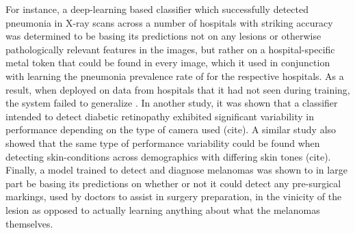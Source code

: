 	For instance, a deep-learning based classifier which successfully detected pneumonia in X-ray scans across a number of hospitals with striking accuracy was determined to be basing its predictions not on any lesions or otherwise pathologically relevant features in the images, but rather on a hospital-specific metal token that could be found in every image, which it used in conjunction with learning the pneumonia prevalence rate of for the respective hospitals. As a result, when deployed on data from hospitals that it had not seen during training, the system failed to generalize \cite{pneumonia}. In another study, it was shown that a classifier intended to detect diabetic retinopathy exhibited significant variability in performance depending on the type of camera used (cite). A similar study also showed that the same type of performance variability could be found when detecting skin-conditions across demographics with differing skin tones (cite). Finally, a model trained to detect and diagnose melanomas  was shown to in large part be basing its predictions on whether or not it could detect any pre-surgical markings, used by doctors to assist in surgery preparation, in the vinicity of the lesion as opposed to actually learning anything about what the melanomas themselves\cite{skin_shortcut}.  
	 
